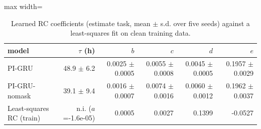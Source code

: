 \begin{table}[H]
\centering\small
\caption{Learned RC coefficients (estimate task, mean $\pm$ s.d. over five seeds) against a least-squares fit on clean training data.}\label{tab:coef_estimate}
\begin{adjustbox}{max width=\textwidth}
\begin{tabular}{lrrrrr}
\toprule
model & $\tau$ (h) & $b$ & $c$ & $d$ & $e$ \\
\midrule
PI-GRU & 48.9 $\pm$ 6.2 & 0.0025 $\pm$ 0.0005 & 0.0055 $\pm$ 0.0008 & 0.0045 $\pm$ 0.0005 & 0.1957 $\pm$ 0.0029 \\
PI-GRU-nomask & 39.1 $\pm$ 9.4 & 0.0016 $\pm$ 0.0007 & 0.0074 $\pm$ 0.0016 & 0.0060 $\pm$ 0.0012 & 0.1962 $\pm$ 0.0037 \\
Least-squares RC (train) & n.i. ($a$=-1.6e-05) & 0.0005 & 0.0027 & 0.1399 & -0.0527 \\
\bottomrule
\end{tabular}
\end{adjustbox}
\end{table}
